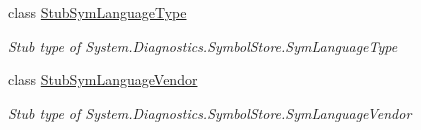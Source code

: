 \begin{DoxyCompactItemize}
class \hyperlink{class_system_1_1_diagnostics_1_1_symbol_store_1_1_fakes_1_1_stub_sym_language_type}{Stub\-Sym\-Language\-Type}
\begin{DoxyCompactList}\small\item\em Stub type of System.\-Diagnostics.\-Symbol\-Store.\-Sym\-Language\-Type\end{DoxyCompactList}\item 
class \hyperlink{class_system_1_1_diagnostics_1_1_symbol_store_1_1_fakes_1_1_stub_sym_language_vendor}{Stub\-Sym\-Language\-Vendor}
\begin{DoxyCompactList}\small\item\em Stub type of System.\-Diagnostics.\-Symbol\-Store.\-Sym\-Language\-Vendor\end{DoxyCompactList}\end{DoxyCompactItemize}

